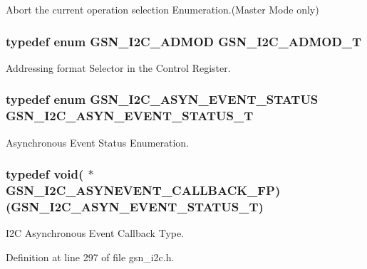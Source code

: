 Abort the current operation selection Enumeration.(Master Mode only) 

\hypertarget{a00649_gac3021fdaf2e11a7972d53d5292ad5f26}{
\subsubsection[{GSN\_\-I2C\_\-ADMOD\_\-T}]{\setlength{\rightskip}{0pt plus 5cm}typedef enum {\bf GSN\_\-I2C\_\-ADMOD}  {\bf GSN\_\-I2C\_\-ADMOD\_\-T}}}
\label{a00649_gac3021fdaf2e11a7972d53d5292ad5f26}


Addressing format Selector in the Control Register. 

\hypertarget{a00649_ga4a73cb21823d744414fed4d0aef5eb3c}{
\subsubsection[{GSN\_\-I2C\_\-ASYN\_\-EVENT\_\-STATUS\_\-T}]{\setlength{\rightskip}{0pt plus 5cm}typedef enum {\bf GSN\_\-I2C\_\-ASYN\_\-EVENT\_\-STATUS}  {\bf GSN\_\-I2C\_\-ASYN\_\-EVENT\_\-STATUS\_\-T}}}
\label{a00649_ga4a73cb21823d744414fed4d0aef5eb3c}


Asynchronous Event Status Enumeration. 

\hypertarget{a00649_gab1a00d4a51461218cbbafc33b29ddd89}{
\subsubsection[{GSN\_\-I2C\_\-ASYNEVENT\_\-CALLBACK\_\-FP}]{\setlength{\rightskip}{0pt plus 5cm}typedef void( $\ast$ {\bf GSN\_\-I2C\_\-ASYNEVENT\_\-CALLBACK\_\-FP})({\bf GSN\_\-I2C\_\-ASYN\_\-EVENT\_\-STATUS\_\-T})}}
\label{a00649_gab1a00d4a51461218cbbafc33b29ddd89}


I2C Asynchronous Event Callback Type. 



Definition at line 297 of file gsn\_\-i2c.h.

